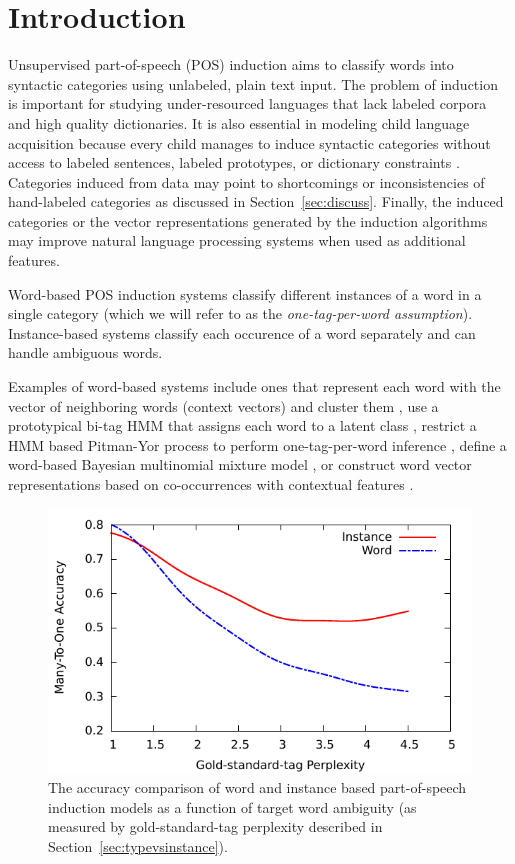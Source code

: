 \section{Introduction} \label{sec:intro}

Unsupervised part-of-speech (POS) induction aims to classify words
into syntactic categories using unlabeled, plain text input.  The
problem of induction is important for studying under-resourced
languages that lack labeled corpora and high quality dictionaries.  It
is also essential in modeling child language acquisition because every
child manages to induce syntactic categories without access to labeled
sentences, labeled prototypes, or dictionary constraints
\cite{ambridge2011child}.  Categories induced from data may point to
shortcomings or inconsistencies of hand-labeled categories as
discussed in Section~\ref{sec:discuss}.  Finally, the induced
categories or the vector representations generated by the induction
algorithms may improve natural language processing systems when used
as additional features.

Word-based POS induction systems classify different instances of a
word in a single category (which we will refer to as the {\em
  one-tag-per-word assumption}).  Instance-based systems classify each
occurence of a word separately and can handle ambiguous words.

Examples of word-based systems include ones that represent each word
with the vector of neighboring words (context vectors) and
cluster them
\cite{Schutze:1995:DPT:976973.976994,lamar-EtAl:2010:Short,Lamar:2010:LCU:1870658.1870736},
use a prototypical bi-tag HMM that assigns each word to a latent
class
\cite{Brown:1992:CNG:176313.176316,Clark:2003:CDM:1067807.1067817},
restrict a HMM based Pitman-Yor process to perform one-tag-per-word
inference \cite{blunsom-cohn:2011:ACL-HLT2011}, define a word-based
Bayesian multinomial mixture model
\cite{christodoulopoulos-goldwater-steedman:2011:EMNLP}, or construct
word vector representations based on co-occurrences with contextual
features \cite{yatbaz-sert-yuret:2012:EMNLP-CoNLL}.

\begin{figure}[t] \centering
  \includegraphics[width=.7\textwidth]{ksmooth-f.pdf} 
  \caption{The accuracy comparison of word and instance based
    part-of-speech induction models as a function of target word
    ambiguity (as measured by gold-standard-tag perplexity described
    in Section~\ref{sec:typevsinstance}).}
  \label{fig:perplexity}
\end{figure}


